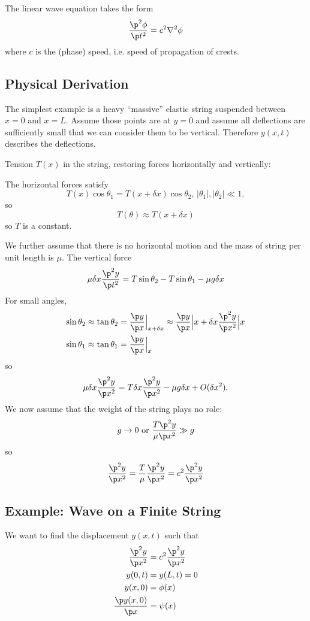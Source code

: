 \documentclass[a4paper]{article}
\begin{document}
The linear wave equation takes the form
\[
\frac{\p^2\phi}{\p t^2} = c^2\nabla^2\phi
\]
where \(c\) is the (phase) speed, i.e. speed of propagation of crests.

\subsection{Physical Derivation}

The simplest example is a heavy ``massive'' elastic string suspended between \(x=0\) and \(x=L\). Assume those points are at \(y=0\) and assume all deflections are sufficiently small that we can consider them to be vertical. Therefore \(y(x,t)\) describes the deflections.

Tension \(T(x)\) in the string, restoring forces horizontally and vertically:

The horizontal forces satisfy
\[
  T(x)\cos\theta_1 = T(x+\delta x)\cos\theta_2,\, |\theta_1|,|\theta_2| \ll 1,
\]
so
\[
T(\theta) \approx T(x+\delta x)
\]
so \(T\) is a constant.

We further assume that there is no horizontal motion and the mass of string per unit length is \(\mu\). The vertical force
\[
\mu\delta x \frac{\p^2 y}{\p t^2} = T\sin \theta_2 -T\sin\theta_1 - \mu g\delta x
\]
For small angles,
\begin{align*}
  \sin \theta_2 &\approx \tan\theta_2 = \frac{\p y}{\p x}\Big|_{x+\delta x} \approx \frac{\p y}{\p x}\Big|x + \delta x \frac{\p^2 y}{\p x^2}\Big|x \\
  \sin \theta_1 &\approx \tan\theta_1 = \frac{\p y}{\p x}\Big|_x
\end{align*}
so
\[
  \mu\delta x \frac{\p^2 y}{\p x^2} = T\delta x \frac{\p^2 y}{\p x^2} - \mu g\delta x + O(\delta x^2).
\]
We now assume that the weight of the string plays no role:
\[
  g\to 0 \text{ or } \frac{T\p^2 y}{\mu\p x^2} \gg g
\]
so
\[
  \frac{\p^2 y}{\p x^2} = \frac{T}{\mu} \frac{\p^2 y}{\p x^2} = c^2\frac{\p^2 y}{\p x^2}
\]

\subsection{Example: Wave on a Finite String}

We want to  find the displacement \(y(x,t)\) such that
\begin{align*}
  \frac{\p^2 y}{\p x^2} &= c^2 \frac{\p^2 y}{\p x^2} \\
  y(0,t) &= y(L,t) = 0 \\
  y(x,0) &= \phi(x) \\
  \frac{\p y(x,0)}{\p x} &= \psi(x)
\end{align*}
\end{document}
